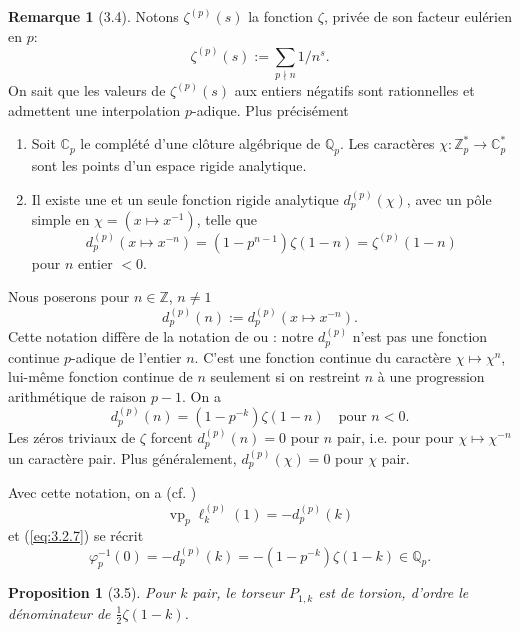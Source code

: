 \documentclass[12pt,a4paper]{article}
\theoremstyle{plain}
\newtheorem{proposition}[theorem]{Proposition}
\theoremstyle{definition}
\newtheorem{remark}[theorem]{Remarque}
\theoremstyle{remark}
\begin{document}
\begin{remark}[3.4]\label{rem:3.4}
Notons $\zeta^{(p)}(s)$ la fonction $\zeta$, priv\'ee de son facteur eul\'erien en $p$:
\[
\zeta^{(p)}(s) := \sum_{p \nmid n} 1/n^s.
\]
On sait que les valeurs de $\zeta^{(p)}(s)$ aux entiers n\'egatifs sont rationnelles et
admettent une interpolation $p$-adique. Plus pr\'ecis\'ement

\begin{enumerate}[label=(\alph*)]
\item Soit $\mathbb{C}_p$ le compl\'et\'e d'une cl\^oture alg\'ebrique de $\mathbb{Q}_p$.
Les caract\`eres $\chi: \mathbb{Z}_p^* \to \mathbb{C}_p^*$ sont les points d'un espace rigide
analytique.

\item Il existe une et un seule fonction rigide analytique $d_p^{(p)}(\chi)$, avec un
p\^ole simple en $\chi = (x \mapsto x^{-1})$, telle que
\[
d_p^{(p)}(x \mapsto x^{-n}) = (1-p^{n-1}) \zeta(1-n) = \zeta^{(p)}(1-n)
\]
pour $n$ entier $< 0$.
\end{enumerate}

Nous poserons pour $n \in \mathbb{Z}$, $n \neq 1$
\[
d_p^{(p)}(n) := d_p^{(p)}(x \mapsto x^{-n}).
\]
Cette notation diff\`ere de la notation de \cite{C} ou \cite{Ko}: notre $d_p^{(p)}$ n'est pas
une fonction continue $p$-adique de l'entier $n$. C'est une fonction continue du
caract\`ere $\chi \mapsto \chi^n$, lui-m\^eme fonction continue de $n$ seulement si on
restreint $n$ \`a une progression arithm\'etique de raison $p-1$. On a
\[
d_p^{(p)}(n) = (1-p^{-k}) \zeta(1-n) \quad \text{pour } n < 0.
\]
Les z\'eros triviaux de $\zeta$ forcent $d_p^{(p)}(n) = 0$ pour $n$ pair, i.e. pour pour
$\chi \mapsto \chi^{-n}$ un caract\`ere pair. Plus g\'en\'eralement,
$d_p^{(p)}(\chi) = 0$ pour $\chi$ pair.

Avec cette notation, on a (cf. \cite{C}\cite{Ko})
\[
\operatorname{vp}_p \ell_k^{(p)}(1) = -d_p^{(p)}(k)
\]
et (\ref{eq:3.2.7}) se r\'ecrit
\begin{equation}\label{eq:3.4.1}
\varphi_p^{-1}(0) = -d_p^{(p)}(k) = -(1-p^{-k}) \zeta(1-k) \in \mathbb{Q}_p.
\end{equation}
\end{remark}

\begin{proposition}[3.5]\label{prop:3.5}
Pour $k$ pair, le torseur $P_{1,k}$ est de torsion, d'ordre le d\'enominateur de
$\frac{1}{2}\zeta(1-k)$.
\end{proposition}
\end{document}
